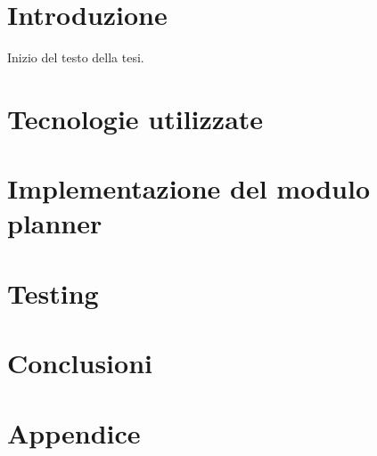 \documentclass[12pt, twoside]{report}
\begin{document}
    
    \nocite{*}
    
    \pagestyle{empty}
    
    \tableofcontents
    \pagestyle{fancy}
    \chapter{Introduzione}
    Inizio del testo della tesi.
    
    \chapter{Tecnologie utilizzate}
    
    \chapter{Implementazione del modulo planner}
    
    \chapter{Testing}
    
    \chapter{Conclusioni}
    
    \chapter*{Appendice}
    
    
    \printbibliography
\end{document}
